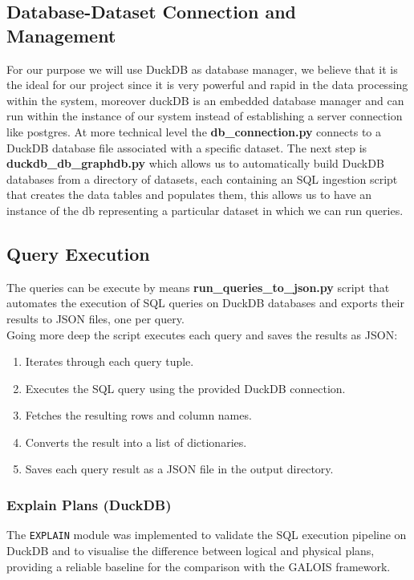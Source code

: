 \documentclass[12pt,a4paper]{article}
\begin{document}
\subsection{Database-Dataset Connection and Management}
For our purpose we will use DuckDB as database manager, we believe that it is the ideal for our project since it is very powerful and rapid in the data processing within the system, moreover duckDB is an embedded database manager and can run within the instance of our system instead of establishing a server connection like postgres.
At more technical level the \textbf{db\_connection.py} connects to a DuckDB database file associated with a specific dataset.
The next step is \textbf{duckdb\_db\_graphdb.py} which allows us to automatically build DuckDB databases from a directory of datasets, each containing an SQL ingestion script that creates the data tables and populates them,  this allows us to have an instance of the db representing a particular dataset  in which we can run queries.

\subsection{Query Execution}
The queries can be execute by means \textbf{run\_queries\_to\_json.py} script that automates the execution of SQL queries on DuckDB databases and exports their results to JSON files, one per query.\\
Going more deep the script executes each query and saves the results as JSON:

\begin{enumerate}
    \item Iterates through each query tuple.
    \item Executes the SQL query using the provided DuckDB connection.
    \item Fetches the resulting rows and column names.
    \item Converts the result into a list of dictionaries.
    \item Saves each query result as a JSON file in the output directory.
\end{enumerate}

\subsubsection{Explain Plans (DuckDB)}
\label{sec:explain-plans}

The \texttt{EXPLAIN} module was implemented to validate the SQL execution
pipeline on DuckDB and to visualise the difference between logical and
physical plans, providing a reliable baseline for the comparison with the
GALOIS framework. 
\end{document}
